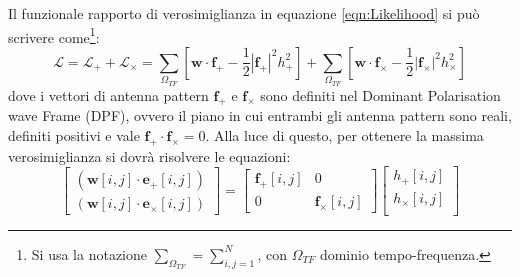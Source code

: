Il funzionale rapporto di verosimiglianza in equazione \ref{eqn:Likelihood} si può scrivere come\footnote{Si usa la notazione $\sum_{\Omega_{TF}} = \sum_{i,j=1}^N$, con $\Omega_{TF}$ dominio tempo-frequenza.}:
\begin{equation}
	\mathcal{L} =  \mathcal{L}_+ + \mathcal{L}_\times = \sum_{\Omega_{TF}}\left[ \mathbf{w} \cdot \mathbf{f}_+ - \frac{1}{2}|\mathbf{f}_+|^2h_+^2\right] + \sum_{\Omega_{TF}}\left[ \mathbf{w} \cdot \mathbf{f}_\times - \frac{1}{2}|\mathbf{f}_\times|^2h_\times^2\right]
	\label{eqn:label_separated}
\end{equation}
dove i vettori di antenna pattern $\mathbf{f}_+$ e $\mathbf{f}_\times$ sono definiti nel Dominant Polarisation wave Frame (DPF), ovvero il piano in cui entrambi gli antenna pattern sono reali, definiti positivi e vale $\mathbf{f}_+ \cdot \mathbf{f}_\times = 0$.  Alla luce di questo, per ottenere la massima verosimiglianza si dovrà risolvere le equazioni:
\begin{equation}
	\begin{bmatrix}
	(\mathbf{w}[i,j]\cdot \mathbf{e}_+[i,j])\\
	(\mathbf{w}[i,j]\cdot \mathbf{e}_\times[i,j])
	\end{bmatrix}
	=
	\begin{bmatrix}
	\mathbf{f}_+[i,j]	&0\\
	0					&\mathbf{f}_\times[i,j]
	\end{bmatrix}
	\begin{bmatrix}
	h_+[i,j]\\
	h_\times[i,j]\\
	\end{bmatrix}
	\label{eqn:sistema_soluzione}
\end{equation}

